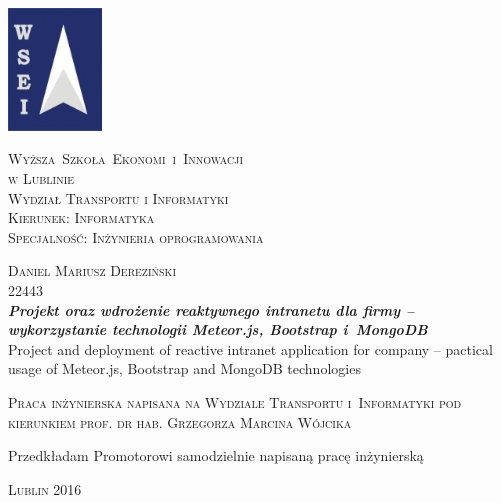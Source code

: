 \noindent

\begin{center}\small
\includegraphics[width=25mm]{./title/logowsei.jpg}
\end{center}

\begin{center}
{\LARGE\textsc{Wyższa~Szkoła~Ekonomi~i~Innowacji \\ w Lublinie}}\\[0.5cm]
{\Large\textsc{Wydział Transportu i Informatyki}}\\[0.5cm]
{\Large\textsc{Kierunek:  Informatyka}}\\[0.5cm]
{\Large\textsc{Specjalność: Inżynieria oprogramowania}}\\[0.5cm]
\end{center}


\begin{center}
\begin{large}
\textsc{Daniel Mariusz Dereziński} \\
22443 \\[0.5cm]

\huge{\bf{\it{Projekt oraz wdrożenie reaktywnego intranetu dla firmy -- wykorzystanie technologii Meteor.js, Bootstrap i~MongoDB}}} \\[0.3cm]
\small{Project and deployment of reactive intranet application for company -- pactical usage of Meteor.js, Bootstrap and MongoDB technologies}
\end{large}
\end{center}
\vspace{2.0cm}



\begin{flushright}
\begin{minipage}{7.4cm}
\begin{spacing}{1.0}
\textsc{Praca inżynierska napisana na Wydziale Transportu i~Informatyki pod kierunkiem prof. dr hab. Grzegorza Marcina Wójcika}
\end{spacing}
\end{minipage}
\end{flushright}
\vfill

\begin{flushleft}
\vspace{-4.5cm}
\begin{minipage}{7.4cm}
\begin{spacing}{1.0}
\small{Przedkładam Promotorowi samodzielnie napisaną pracę inżynierską}
\end{spacing}
\end{minipage}
\end{flushleft}
\vspace{2.5cm}
\vfill

\begin{center}
\textsc{Lublin 2016}
\end{center}
